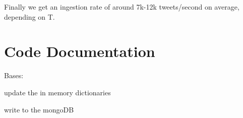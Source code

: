 \documentclass[letterpaper,10pt,english]{sphinxmanual}
\begin{document}
Finally we get an ingestion rate of around 7k-12k tweets/second on average, depending on T.


\section{Code Documentation}
\label{\detokenize{mongoDB_data_ingestion:module-ingest_raw}}\label{\detokenize{mongoDB_data_ingestion:code-documentation}}

\begin{fulllineitems}
\label{\detokenize{mongoDB_data_ingestion:ingest_raw.Ingest}}
Bases: 

\begin{fulllineitems}
\label{\detokenize{mongoDB_data_ingestion:ingest_raw.Ingest.aggregate}}
\end{fulllineitems}


\begin{fulllineitems}
\label{\detokenize{mongoDB_data_ingestion:ingest_raw.Ingest.exit}}
\end{fulllineitems}


\begin{fulllineitems}
\label{\detokenize{mongoDB_data_ingestion:ingest_raw.Ingest.insert_tweet}}
update the in memory dictionaries

\end{fulllineitems}


\begin{fulllineitems}
\label{\detokenize{mongoDB_data_ingestion:ingest_raw.Ingest.populate}}
write to the mongoDB

\end{fulllineitems}


\begin{fulllineitems}
\label{\detokenize{mongoDB_data_ingestion:ingest_raw.Ingest.worker}}
\end{fulllineitems}


\end{fulllineitems}
\end{document}
